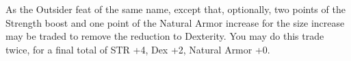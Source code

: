 As the Outsider feat of the same name, except that, optionally, two points of the Strength boost and one point of the Natural Armor increase for the size increase may be traded to remove the reduction to Dexterity. You may do this trade twice, for a final total of STR +4, Dex +2, Natural Armor +0.



